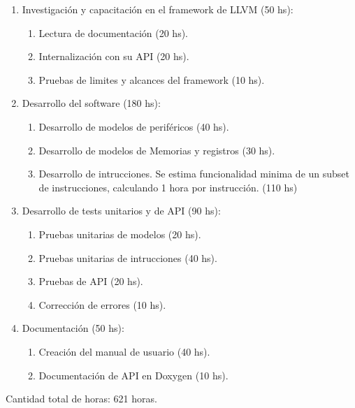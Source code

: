 \begin{enumerate}
\item Investigación y capacitación en el framework de LLVM (50 hs):

  \begin{enumerate}
  \item Lectura de documentación (20 hs).
  \item Internalización con su API (20 hs).
  \item Pruebas de limites y alcances del framework (10 hs).
  \end{enumerate}

\item Desarrollo del software (180 hs):

  \begin{enumerate}
  \item Desarrollo de modelos de periféricos (40 hs).
  \item Desarrollo de modelos de Memorias y registros (30 hs).
  \item Desarrollo de intrucciones. Se estima funcionalidad minima de un subset de instrucciones, calculando 1 hora por instrucción. (110 hs)
  \end{enumerate}


\item Desarrollo de tests unitarios y de API (90 hs):

  \begin{enumerate}
  \item Pruebas unitarias de modelos (20 hs).
  \item Pruebas unitarias de intrucciones (40 hs).
  \item Pruebas de API (20 hs).
  \item Corrección de errores (10 hs).
  \end{enumerate}


\item Documentación (50 hs):

\begin{enumerate}
\item Creación del manual de usuario (40 hs).
\item Documentación de API en Doxygen (10 hs).
\end{enumerate}

\end{enumerate}


Cantidad total de horas: 621 horas.
